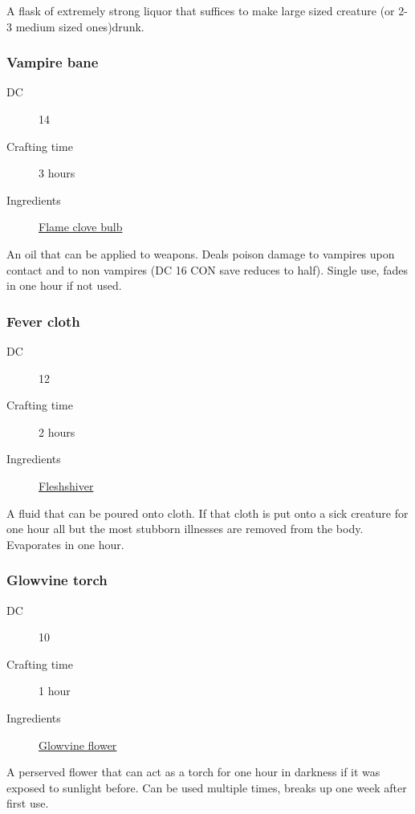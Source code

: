 A flask of extremely strong liquor that suffices to make large sized creature (or 2-3 medium sized ones)drunk.

\subsubsection{Vampire bane}
\label{Vampire bane}

\begin{description}
\item [DC] 14
\item [Crafting time] 3 hours
\item [Ingredients] \hyperref[Flame clove]{Flame clove bulb}
\end{description}

An oil that can be applied to weapons. Deals  poison damage to vampires upon contact and 
 to non vampires (DC 16 CON save reduces to half). Single use, fades in one hour if not used.

\subsubsection{Fever cloth}
\label{Fever cloth}

\begin{description}
\item [DC] 12
\item [Crafting time] 2 hours
\item [Ingredients] \hyperref[Fleshshiver]{Fleshshiver}
\end{description}

A fluid that can be poured onto cloth. If that cloth is put onto a sick creature for one hour
 all but the most stubborn illnesses are removed from the body. Evaporates in one hour.

\subsubsection{Glowvine torch}
\label{Glowvine torch}

\begin{description}
\item [DC] 10
\item [Crafting time] 1 hour
\item [Ingredients] \hyperref[Glowvine]{Glowvine flower}
\end{description}

A perserved flower that can act as a torch for one hour in darkness if it was exposed to sunlight before. 
Can be used multiple times, breaks up one week after first use.

